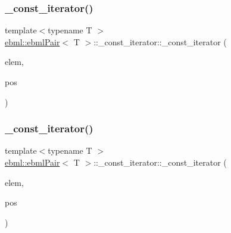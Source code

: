 \subsubsection{\texorpdfstring{\+\_\+const\+\_\+iterator()}{\_const\_iterator()}\hspace{0.1cm}{\footnotesize\ttfamily [1/3]}}
{\footnotesize\ttfamily template$<$typename T $>$ \\
\mbox{\hyperlink{classebml_1_1ebmlPair}{ebml\+::ebml\+Pair}}$<$ T $>$\+::\+\_\+const\+\_\+iterator\+::\+\_\+const\+\_\+iterator (\begin{DoxyParamCaption}\item[{const \mbox{\hyperlink{namespaceebml_a9c804317d5b51ef8844bdffe5e8cb4b3}{c\+\_\+ebml\+Pair\+\_\+sp}}$<$ T $>$ \&}]{elem,  }\item[{unsigned char}]{pos }\end{DoxyParamCaption})\hspace{0.3cm}{\ttfamily [protected]}}

\mbox{\label{classebml_1_1ebmlPair_1_1__const__iterator_a703a5a75fe4cd7809ab31cdd1b3cb54b}} 
\subsubsection{\texorpdfstring{\+\_\+const\+\_\+iterator()}{\_const\_iterator()}\hspace{0.1cm}{\footnotesize\ttfamily [2/3]}}
{\footnotesize\ttfamily template$<$typename T $>$ \\
\mbox{\hyperlink{classebml_1_1ebmlPair}{ebml\+::ebml\+Pair}}$<$ T $>$\+::\+\_\+const\+\_\+iterator\+::\+\_\+const\+\_\+iterator (\begin{DoxyParamCaption}\item[{\mbox{\hyperlink{namespaceebml_a9c804317d5b51ef8844bdffe5e8cb4b3}{c\+\_\+ebml\+Pair\+\_\+sp}}$<$ T $>$ \&\&}]{elem,  }\item[{unsigned char}]{pos }\end{DoxyParamCaption})\hspace{0.3cm}{\ttfamily [protected]}}

\mbox{\label{classebml_1_1ebmlPair_1_1__const__iterator_a4e541f74f5e9b207f07c843eba7dbf89}} 
